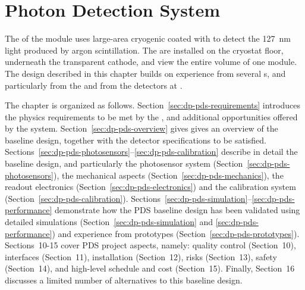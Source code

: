 \chapter{Photon Detection System}
\label{ch:dp-pds}

The  of the \dune \dual module uses large-area cryogenic  coated with  to detect the \SI{127}{\nm} light produced by argon scintillation. The  are installed on the cryostat floor, underneath the  transparent cathode, and view the entire \lar volume of one  module. The design described in this chapter builds on experience from several \lartpc{}s, and particularly from the  and from the  detectors at . 

The chapter is organized as follows. Section~\ref{sec:dp-pds-requirements} introduces the physics requirements to be met by the , and additional opportunities offered by the system. Section~\ref{sec:dp-pds-overview} gives gives an overview of the  baseline design, together with the detector specifications to be satisfied. Sections~\ref{sec:dp-pds-photosensors}--\ref{sec:dp-pds-calibration} describe in detail the  baseline design, and particularly the  photosensor system (Section~\ref{sec:dp-pds-photosensors}), the mechanical aspects (Section~\ref{sec:dp-pds-mechanics}),  the readout electronics (Section~\ref{sec:dp-pds-electronics}) and the calibration system (Section~\ref{sec:dp-pds-calibration}). Sections~\ref{sec:dp-pds-simulation}--\ref{sec:dp-pds-performance} demonstrate how the PDS baseline design has been validated using detailed simulations (Section~\ref{sec:dp-pds-simulation} and \ref{sec:dp-pds-performance}) and experience from prototypes (Section~\ref{sec:dp-pds-prototypes}). Sections~10-15 cover PDS project aspects, namely: quality control (Section~10), interfaces (Section~11), installation (Section~12), risks (Section~13), safety (Section~14), and high-level schedule and cost (Section~15). Finally, Section~16 discusses a limited number of alternatives to this baseline design.  
















